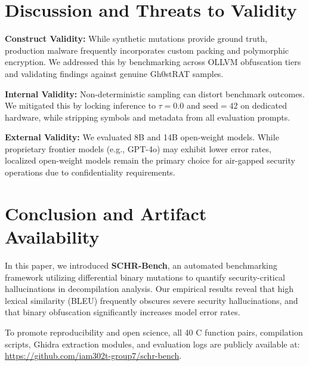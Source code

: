 \documentclass[runningheads]{llncs}
\begin{document}
\section{Discussion and Threats to Validity}
\textbf{Construct Validity:} While synthetic mutations provide ground truth, production malware frequently incorporates custom packing and polymorphic encryption. We addressed this by benchmarking across OLLVM obfuscation tiers and validating findings against genuine Gh0stRAT samples.

\textbf{Internal Validity:} Non-deterministic sampling can distort benchmark outcomes. We mitigated this by locking inference to $\tau = 0.0$ and $\text{seed} = 42$ on dedicated hardware, while stripping symbols and metadata from all evaluation prompts.

\textbf{External Validity:} We evaluated 8B and 14B open-weight models. While proprietary frontier models (e.g., GPT-4o) may exhibit lower error rates, localized open-weight models remain the primary choice for air-gapped security operations due to confidentiality requirements.

\section{Conclusion and Artifact Availability}
In this paper, we introduced \textbf{SCHR-Bench}, an automated benchmarking framework utilizing differential binary mutations to quantify security-critical hallucinations in decompilation analysis. Our empirical results reveal that high lexical similarity (BLEU) frequently obscures severe security hallucinations, and that binary obfuscation significantly increases model error rates.

To promote reproducibility and open science, all 40 C function pairs, compilation scripts, Ghidra extraction modules, and evaluation logs are publicly available at: \url{https://github.com/iam302t-group7/schr-bench}.



\end{document}

